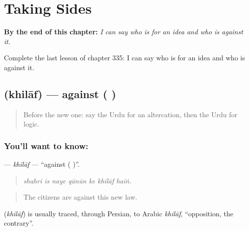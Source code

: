 
\chapter{Taking Sides}
\label{ch:ur-taking-sides}

\begin{chapteropening}
\textbf{By the end of this chapter:} \emph{I can say who is for an idea and who is against it.}

Complete the last lesson of chapter 335: I can say who is for an idea and who is against it.
\end{chapteropening}

\section[\texorpdfstring{\ur{خلاف} (khilāf)}{خلاف (khilāf)}]{ (khilāf) — against ( )}

\label{lesson:UR-C335-khilaf}



\begin{quote}
Before the new one: say the Urdu for an altercation, then the Urdu for logic.
\end{quote}

\subsection*{You'll want to know: }
\textbf{} — \emph{khilāf} — \textquotedblleft{}against ( )\textquotedblright{}.

\begin{quote}
      
\end{quote}

\begin{quote}
\emph{shahrī is naye qānūn ke khilāf haiṅ.}
\end{quote}

\begin{quote}
The citizens are against this new law.
\end{quote}

\begin{cousinweb}
\textbf{} (\emph{khilāf}) is usually traced, through Persian, to Arabic \emph{khilāf}, \textquotedblleft{}opposition, the contrary\textquotedblright{}.
\end{cousinweb}

